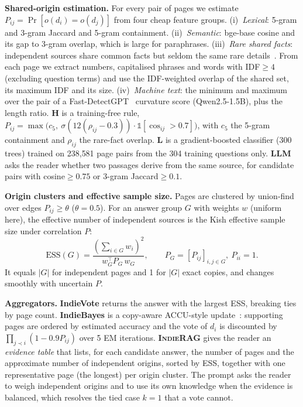 \documentclass[sigconf,review,anonymous]{acmart}
\newcommand{\sys}{\textsc{IndieRAG}}
\newcommand{\ess}{\mathrm{ESS}}
\newcommand{\para}[1]{\smallskip\noindent\textbf{#1}\enspace}
\begin{document}
\para{Shared-origin estimation.} For every pair of pages we estimate $P_{ij}=\Pr[o(d_i)=o(d_j)]$ from four cheap feature
groups.
(i)~\emph{Lexical}: 5-gram and 3-gram Jaccard and 5-gram containment.
(ii)~\emph{Semantic}: bge-base cosine and its gap to 3-gram overlap, which is large for paraphrases.
(iii)~\emph{Rare shared facts}: independent sources share common facts but seldom the same rare
details~\cite{dong2009integrating}. From each page we extract numbers, capitalised phrases and words with IDF$\geq4$
(excluding question terms) and use the IDF-weighted overlap of the shared set, its maximum IDF and its size.
(iv)~\emph{Machine text}: the minimum and maximum over the pair of a Fast-DetectGPT~\cite{bao2024fastdetectgpt}
curvature score (Qwen2.5-1.5B), plus the length ratio.
\textbf{H} is a training-free rule,
$P_{ij}=\max\!\big(c_5,\ \sigma(12(\rho_{ij}-0.3))\cdot\mathbb{1}[\cos_{ij}>0.7]\big)$, with $c_5$ the 5-gram
containment and $\rho_{ij}$ the rare-fact overlap. \textbf{L} is a gradient-boosted classifier (300 trees) trained on
238{,}581 page pairs from the 304 training questions only. \textbf{LLM} asks the reader whether two passages derive from
the same source, for candidate pairs with cosine${\geq}0.75$ or 3-gram Jaccard${\geq}0.1$.

\para{Origin clusters and effective sample size.} Pages are clustered by union-find over edges $P_{ij}\geq\theta$
($\theta{=}0.5$). For an answer group $G$ with weights $w$ (uniform here), the effective number of independent sources is
the Kish effective sample size under correlation $P$:
\begin{equation}
\ess(G)=\frac{\left(\sum_{i\in G}w_i\right)^2}{w_G^{\top}P_G\,w_G},\qquad P_G=[P_{ij}]_{i,j\in G},\ P_{ii}=1.
\end{equation}
It equals $|G|$ for independent pages and 1 for $|G|$ exact copies, and changes smoothly with uncertain $P$.

\para{Aggregators.} \textbf{IndieVote} returns the answer with the largest ESS, breaking ties by page count.
\textbf{IndieBayes} is a copy-aware ACCU-style update~\cite{dong2009integrating}: supporting pages are ordered by
estimated accuracy and the vote of $d_i$ is discounted by $\prod_{j\prec i}(1-0.9P_{ij})$ over 5 EM iterations.
\textbf{\sys{}} gives the reader an \emph{evidence table} that lists, for each candidate answer, the number of pages
and the approximate number of independent origins, sorted by ESS, together with one representative page (the longest)
per origin cluster. The prompt asks the reader to weigh independent origins and to use its own knowledge when the
evidence is balanced, which resolves the tied case $k{=}1$ that a vote cannot.
\end{document}
